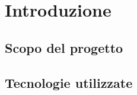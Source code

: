 \documentclass[../report.tex]{subfiles}
\begin{document}
\chapter{Introduzione}\label{c:introduzione}
\section{Scopo del progetto}\label{s:scopo-progetto}

\section{Tecnologie utilizzate}\label{s:teconologie-utilizzate}
\end{document}
